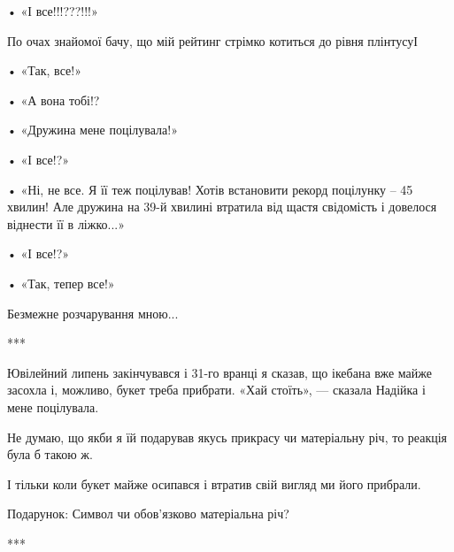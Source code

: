 • «І все!!!???!!!»

По очах знайомої бачу, що мій рейтинг стрімко котиться до рівня плінтусуІ 

• «Так, все!»

• «А вона тобі!?

• «Дружина мене поцілувала!»

• «І все!?»

• «Ні, не все. Я її теж поцілував! Хотів встановити рекорд поцілунку – 45
хвилин! Але дружина на 39-й хвилині втратила від щастя свідомість і довелося
віднести її в ліжко...»

• «І все!?»

• «Так, тепер все!»

Безмежне розчарування мною...

***

Ювілейний липень закінчувався і 31-го вранці я сказав, що ікебана вже майже
засохла і, можливо, букет треба прибрати. «Хай стоїть», — сказала Надійка і
мене поцілувала.

Не думаю, що якби я їй подарував якусь прикрасу чи матеріальну річ, то реакція
була б такою ж. 

І тільки коли букет майже осипався і втратив свій вигляд ми його прибрали.

Подарунок: Символ чи обов’язково матеріальна річ? 

***
